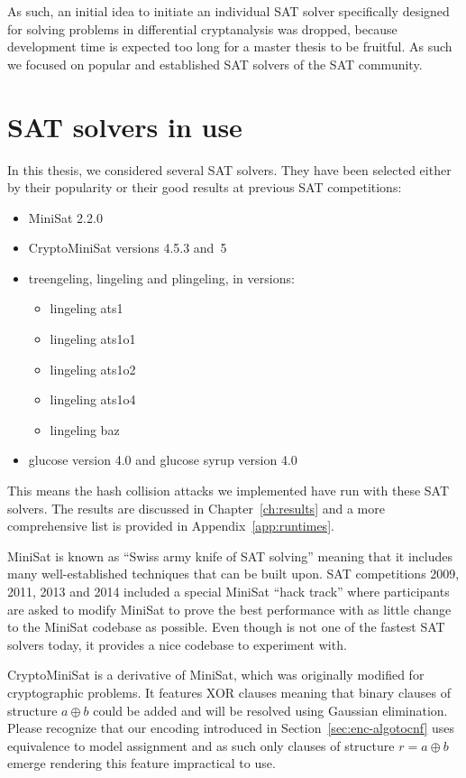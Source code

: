 As such, an initial idea to initiate an individual SAT solver specifically designed for
solving problems in differential cryptanalysis was dropped, because development time
is expected too long for a master thesis to be fruitful. As such we focused on popular
and established SAT solvers of the SAT community.

\section{SAT solvers in use}
\label{sec:sat-solvers}
%
In this thesis, we considered several SAT solvers.
They have been selected either by their popularity
or their good results at previous SAT competitions:
\begin{itemize}
  \item MiniSat 2.2.0
  \item CryptoMiniSat versions 4.5.3 and~5
  \item treengeling, lingeling and plingeling, in versions:
    \begin{itemize}
      \item lingeling ats1
      \item lingeling ats1o1
      \item lingeling ats1o2
      \item lingeling ats1o4
      \item lingeling baz
    \end{itemize}
  \item glucose version 4.0 and glucose syrup version 4.0
\end{itemize}

This means the hash collision attacks we implemented have run with
these SAT solvers. The results are discussed in Chapter~\ref{ch:results}
and a more comprehensive list is provided in Appendix~\ref{app:runtimes}.

MiniSat is known as \enquote{Swiss army knife of SAT solving} meaning that
it includes many well-established techniques that can be built upon.
SAT competitions 2009, 2011, 2013 and 2014 included a special MiniSat
\enquote{hack track} where participants are asked to modify MiniSat to prove the
best performance with as little change to the MiniSat codebase as possible.
Even though is not one of the fastest SAT solvers today, it provides
a nice codebase to experiment with.

CryptoMiniSat is a derivative of MiniSat, which was originally modified
for cryptographic problems. It features XOR clauses meaning that
binary clauses of structure $a \oplus b$ could be added and will be resolved
using Gaussian elimination.
Please recognize that our encoding
introduced in Section~\ref{sec:enc-algotocnf} uses equivalence to model
assignment and as such only clauses of structure $r = a \oplus b$ emerge
rendering this feature impractical to use.

